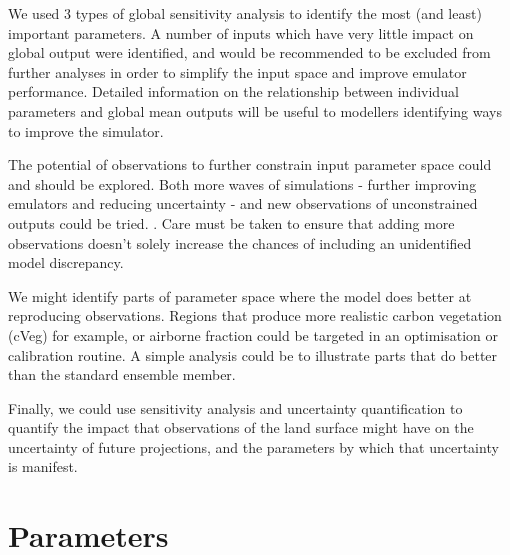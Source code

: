 \documentclass[gmd, manuscript]{copernicus}
\begin{document}
We used 3 types of global sensitivity analysis to identify the most (and least) important parameters.  A number of inputs which have very little impact on global output were identified, and would be recommended to be excluded from further analyses in order to simplify the input space and improve emulator performance. Detailed information on the relationship between individual parameters and global mean outputs will be useful to modellers identifying ways to improve the simulator.

The potential of observations to further constrain input parameter space could and should be explored. Both more waves of simulations - further improving emulators and reducing uncertainty - and new observations of unconstrained outputs could be tried. . Care must be taken to ensure that adding more observations doesn't solely increase the chances of including an unidentified model discrepancy.

We might identify parts of parameter space where the model does better at reproducing observations. Regions that produce more realistic carbon vegetation (cVeg) for example, or airborne fraction could be targeted in an optimisation or calibration routine. A simple analysis could be to illustrate parts that do better than the standard ensemble member.

Finally, we could use sensitivity analysis and uncertainty quantification to quantify the impact that observations of the land surface might have on the uncertainty of future projections, and the parameters by which that uncertainty is manifest. 
    


\disclaimer{}


\appendix

\section{Parameters}\label{sec:app_parameters}
\end{document}
